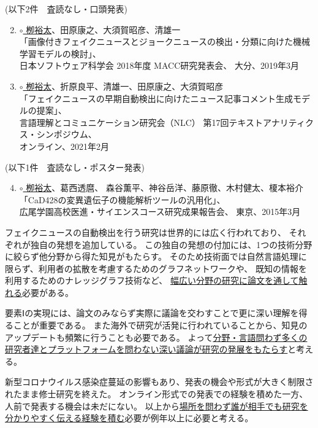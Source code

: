 (以下2件　査読なし・口頭発表)
\begin{enumerate}
    \setcounter{enumi}{1}
    \item \underline{$\circ$ 栁裕太}、田原康之、大須賀昭彦、清雄一\\
        「画像付きフェイクニュースとジョークニュースの検出・分類に向けた機械学習モデルの検討」、\\
        日本ソフトウェア科学会 2018年度 MACC研究発表会、
        大分、2019年3月
    \item \underline{$\circ$ 栁裕太}、折原良平、清雄一、田原康之、大須賀昭彦\\
        「フェイクニュースの早期自動検出に向けたニュース記事コメント生成モデルの提案」、\\
        言語理解とコミュニケーション研究会（NLC） 第17回テキストアナリティクス・シンポジウム、\\
        オンライン、2021年2月
\end{enumerate}
(以下1件　査読なし・ポスター発表)
\begin{enumerate}
    \setcounter{enumi}{3}
    \item \underline{$\circ$ 栁裕太}、葛西透麿、 森谷薫平、神谷岳洋、藤原徹、木村健太、榎本裕介\\
        「CaD428の変異遺伝子の機能解析ツールの汎用化」、\\
        広尾学園高校医進・サイエンスコース研究成果報告会、
        東京、2015年3月
\end{enumerate}

\vspace{5mm}
\noindent
{}
フェイクニュースの自動検出を行う研究は世界的には広く行われており、
それぞれが独自の発想を追加している。
この独自の発想の付加には、1つの技術分野に絞らず他分野から得た知見がもたらす。
そのため技術面では自然言語処理に限らず、利用者の拡散を考慮するためのグラフネットワークや、
既知の情報を利用するためのナレッジグラフ技術など、
\underline{幅広い分野の研究に論文を通して触れる}必要がある。

要素Ⅰの実現には、論文のみならず実際に議論を交わすことで更に深い理解を得ることが重要である。
また海外で研究が活発に行われていることから、知見のアップデートも頻繁に行うことも必要である。
よって\underline{分野・言語問わず多くの研究者達とプラットフォームを問わない深い議論が研究の発展をもたらす}と考える。

新型コロナウイルス感染症蔓延の影響もあり、発表の機会や形式が大きく制限されたまま修士研究を終えた。
オンライン形式での発表での経験を積めた一方、人前で発表する機会は未だにない。
以上から\underline{場所を問わず誰が相手でも研究を分かりやすく伝える経験を積む}必要が例年以上に必要と考える。



